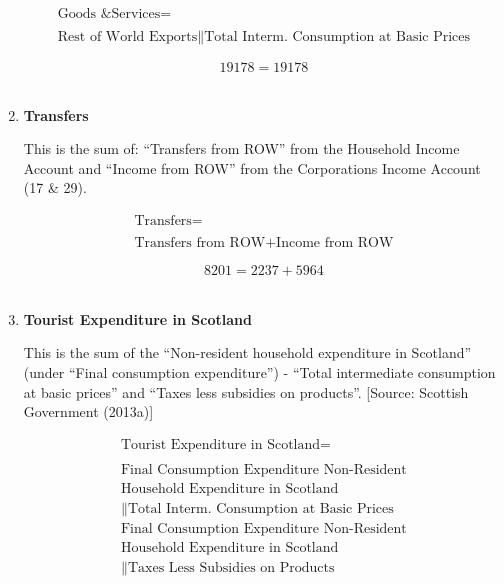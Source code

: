 \begin{enumerate}
\begin{equation}
\begin{split}
\text{Goods \& Services} =  \\ \\
\text{Rest of World Exports}\|\text{Total Interm. Consumption at Basic Prices}
\end{split} \label{eq:2.5.66}
\end{equation}

\begin{equation} \nonumber
19178 = 19178
\end{equation}\\


\item \textbf {Transfers}

This is the sum of: “Transfers from ROW” from the Household Income Account and “Income from ROW” from the Corporations Income Account (17 \& 29).

\begin{equation}
\begin{split}
\text{Transfers} =  \\ \\
\text{Transfers from ROW}+\text{Income from ROW}
\end{split} \label{eq:2.5.67}
\end{equation}

\begin{equation} \nonumber
8201 = 2237+5964
\end{equation}\\



\item \textbf {Tourist Expenditure in Scotland}

This is the sum of the “Non-resident household expenditure in Scotland” (under “Final consumption expenditure”) - “Total intermediate consumption at basic prices” and “Taxes less subsidies on products”. [Source: Scottish Government (2013a)]

\begin{equation}
\begin{split}
\text{Tourist Expenditure in Scotland} =  \\ \\
\text{Final Consumption Expenditure Non-Resident}\\
\text{Household Expenditure in Scotland}\\
\|\text{Total Interm. Consumption at Basic Prices}\\
\text{Final Consumption Expenditure Non-Resident}\\
\text{Household Expenditure in Scotland}\\
\|\text{Taxes Less Subsidies on Products}
\end{split} \label{eq:2.5.68}
\end{equation}


\end{enumerate}
